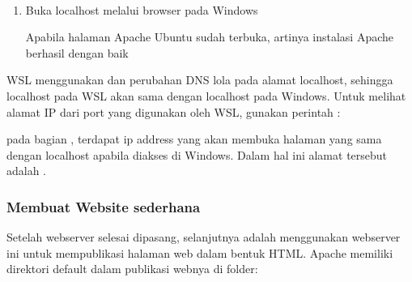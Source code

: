 \documentclass[letterpaper,10pt,english]{sphinxmanual}
\begin{document}
 
\begin{enumerate}
%
\item {} 
Buka localhost melalui browser pada Windows


Apabila halaman Apache Ubuntu sudah terbuka, artinya instalasi Apache berhasil dengan baik

\end{enumerate}

WSL menggunakan  dan perubahan DNS lola pada alamat localhost, sehingga localhost pada WSL akan sama dengan localhost pada Windows. Untuk melihat alamat IP dari port yang digunakan oleh WSL, gunakan perintah :


pada bagian , terdapat ip address yang akan membuka halaman yang sama dengan localhost apabila diakses di Windows. Dalam hal ini alamat tersebut adalah .


\subsubsection{Membuat Website sederhana}
\label{\detokenize{sesi1/linuxserver:membuat-website-sederhana}}
Setelah webserver selesai dipasang, selanjutnya adalah menggunakan webserver ini untuk mempublikasi halaman web dalam bentuk HTML. Apache memiliki direktori default dalam publikasi webnya di folder:

\begin{sphinxVerbatim}[commandchars=\\\{\}]
\end{sphinxVerbatim}
\end{document}
